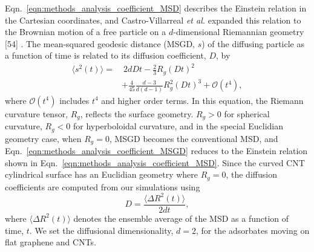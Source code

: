 \documentclass[journal=jpcbfk, layout=twocolumn, manuscript=article]{achemso}
\newcommand\ddfrac[2]{\frac{\displaystyle #1}{\displaystyle #2}}
\begin{document}
Eqn.~\ref{eqn:methods_analysis_coefficient_MSD} describes the Einstein relation in the Cartesian coordinates, and Castro-Villarreal \textit{et al.} expanded this relation to the Brownian motion of a free particle on a $d$-dimensional Riemannian geometry [54]%
. The mean-squared geodesic distance (MSGD, $s$) of the diffusing particle as a function of time is related to its diffusion coefficient, $D$, by
\begin{equation}
\begin{split}
\langle s^2(t)\rangle = &\: 2dDt-\ddfrac{2}{3}R_g(Dt)^2\\
& +\ddfrac{4}{45}\ddfrac{d-3}{d(d-1)}R_g^2(Dt)^3+\mathcal{O}(t^4),
\end{split}
\label{eqn:methods_analysis_coefficient_MSGD}
\end{equation}
where $\mathcal{O}(t^4)$ includes $t^4$ and higher order terms. In this equation, the Riemann curvature tensor, $R_g$, reflects the surface geometry. $R_g > 0$ for spherical curvature, $R_g < 0$ for hyperboloidal curvature, and in the special Euclidian geometry case, when $R_g=0$, MSGD becomes the conventional MSD, and Eqn.~\ref{eqn:methods_analysis_coefficient_MSGD} reduces to the Einstein relation shown in Eqn.~\ref{eqn:methods_analysis_coefficient_MSD}. Since the curved CNT cylindrical surface has an Euclidian geometry where $R_g=0$, the diffusion coefficients are computed from our simulations using
\begin{equation}
D=\ddfrac{\langle\Delta R^2(t)\rangle}{2dt},
\label{eqn:methods_linear}
\end{equation}
where $\langle\Delta R^2(t)\rangle$ denotes the ensemble average of the MSD as a function of time, $t$. We set the diffusional dimensionality, $d=2$, for the adsorbates moving on flat graphene and CNTs.
\end{document}
